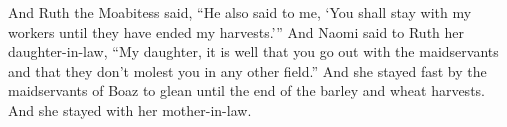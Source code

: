 \begin{enumerate}[align=center]
     And Ruth the Moabitess said, ``He also said to me, `You shall stay with my workers until they have ended my harvests.'''%
     And Naomi said to Ruth her daughter-in-law, ``My daughter, it is well that you go out with the maidservants and that they don't molest you in any other field.''%
     And she stayed fast by the maidservants of Boaz to glean until the end of the barley and wheat harvests. And she stayed with her mother-in-law.%
\end{enumerate}
